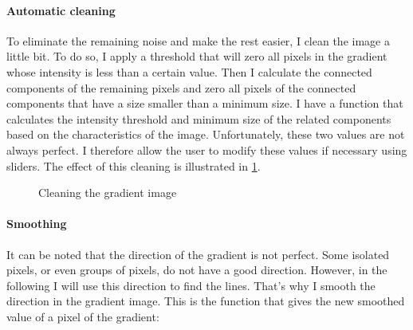 \documentclass[10pt]{article}
\begin{document}
	\paragraph{Automatic cleaning}
	To eliminate the remaining noise and make the rest easier, I clean the image a little bit. To do so, I apply a threshold that will zero all pixels in the gradient whose intensity is less than a certain value. Then I calculate the connected components of the remaining pixels and zero all pixels of the connected components that have a size smaller than a minimum size. I have a function that calculates the intensity threshold and minimum size of the related components based on the characteristics of the image. Unfortunately, these two values are not always perfect. I therefore allow the user to modify these values if necessary using sliders. The effect of this cleaning is illustrated in \figurename \ref{im:clean}.
	
	\begin{figure}
		\centering
		\vspace{-2mm}
		\caption{Cleaning the gradient image}
		\label{im:clean}
	\end{figure}

	\paragraph{Smoothing}
	It can be noted that the direction of the gradient is not perfect. Some isolated pixels, or even groups of pixels, do not have a good direction. However, in the following I will use this direction to find the lines. That's why I smooth the direction in the gradient image. This is the function that gives the new smoothed value of a pixel of the gradient:
	
\end{document}
